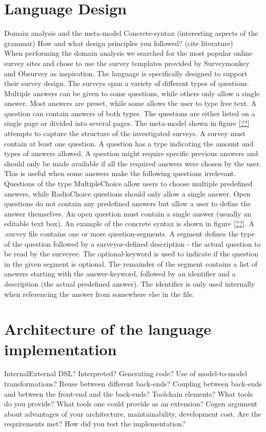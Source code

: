\documentclass[runningheads]{llncs}
\begin{document}
\section{Language Design}
Domain analysis and the meta-model
Concrete-syntax (interesting aspects of the grammar)
How and what design principles you followed? (cite literature) \\
When performing the domain analysis we searched for the most popular online survey sites and chose to use the survey templates provided by Surveymonkey\cite{surveymonkey} and Obsurvey\cite{obsurvey} as inspiration. The language is specifically designed to support their survey design. The surveys span a variety of different types of questions. Multiple answers can be given to some questions, while others only allow a single answer. Most answers are preset, while some allows the user to type free text. A question can contain answers of both types. The questions are either listed on a single page or divided into several pages. 
The meta-model shown in figure \ref{??} attempts to capture the structure of the investigated surveys. A survey must contain at least one question. A question has a type indicating the amount and types of answers allowed. A question might require specific previous answers and should only be made available if all the required answers were chosen by the user. This is useful when some answers make the following questions irrelevant. Questions of the type MultipleChoice allow users to choose multiple predefined answers, while RadioChoice questions should only allow a single answer. Open questions do not contain any predefined answers but allow a user to define the answer themselves. An open question must contain a single answer (usually an editable text box).
An example of the concrete syntax is shown in figure \ref{??}. A .survey file contains one or more question-segments. A segment defines the type of the question followed by a surveyor-defined description - the actual question to be read by the surveyee. The optional-keyword is used to indicate if the question in the given segment is optional. The remainder of the segment contains a list of answers starting with the answer-keyword, followed by an identifier and a description (the actual predefined answer). The identifier is only used internally when referencing the answer from somewhere else in the file.

\section{Architecture of the language implementation}
Internal\/External DSL? Interpreted? Generating code? Use of
model-to-model transformations?
Reuse between different back-ends? Coupling between back-ends and
between the front-end and the back-ends?
Toolchain elements? What tools do you provide? What tools one could
provide as an extension?
Cogen argument about advantages of your architecture, maintainability,
development cost.
Are the requirements met?
How did you test the implementation?
\end{document}
